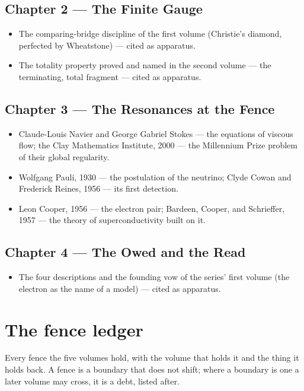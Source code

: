 \subsection*{Chapter 2 --- The Finite Gauge}
\begin{itemize}
\item The comparing-bridge discipline of the first volume (Christie's
diamond, perfected by Wheatstone) --- cited as apparatus.
\item The totality property proved and named in the second volume --- the
terminating, total fragment --- cited as apparatus.
\end{itemize}

\subsection*{Chapter 3 --- The Resonances at the Fence}
\begin{itemize}
\item Claude-Louis Navier and George Gabriel Stokes --- the equations of
viscous flow; the Clay Mathematics Institute, 2000 --- the Millennium
Prize problem of their global regularity.
\item Wolfgang Pauli, 1930 --- the postulation of the neutrino; Clyde Cowan
and Frederick Reines, 1956 --- its first detection.
\item Leon Cooper, 1956 --- the electron pair; Bardeen, Cooper, and
Schrieffer, 1957 --- the theory of superconductivity built on it.
\end{itemize}

\subsection*{Chapter 4 --- The Owed and the Read}
\begin{itemize}
\item The four descriptions and the founding vow of the series' first
volume (the electron as the name of a model) --- cited as apparatus.
\end{itemize}

\section*{The fence ledger}

Every fence the five volumes hold, with the volume that holds it and the
thing it holds back. A fence is a boundary that does not shift; where a
boundary is one a later volume may cross, it is a debt, listed after.

